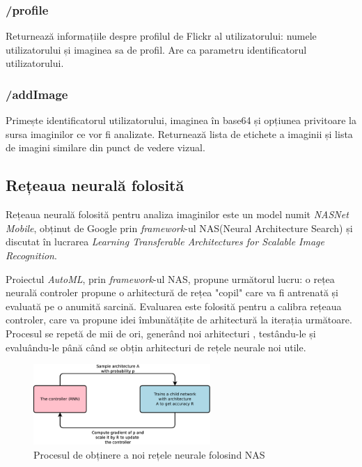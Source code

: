 \subsubsection{/profile}
Returnează informațiile despre profilul de Flickr al utilizatorului: numele utilizatorului și imaginea sa de profil. Are ca parametru identificatorul utilizatorului.

\subsubsection{/addImage}
Primește identificatorul utilizatorului, imaginea în base64 și opțiunea privitoare la sursa imaginilor ce vor fi analizate. Returnează lista de etichete a imaginii și lista de imagini similare din punct de vedere vizual.

\subsection{Rețeaua neurală folosită}
Rețeaua neurală folosită pentru analiza imaginilor este un model numit \textit{NASNet Mobile}, obținut de Google prin \textit{framework}-ul NAS(Neural Architecture Search) și discutat în lucrarea \textit{Learning Transferable Architectures for Scalable Image Recognition}. \cite{DBLP:journals/corr/ZophVSL17}

Proiectul \textit{AutoML}, prin \textit{framework}-ul NAS, propune următorul lucru: o rețea neurală controler propune o arhitectură de rețea "copil" care va fi antrenată și evaluată pe o anumită sarcină. Evaluarea este folosită pentru a calibra rețeaua controler, care va propune idei îmbunătățite de arhitectură la iterația următoare. Procesul se repetă de mii de ori, generând noi arhitecturi , testându-le și evaluându-le până când se obțin arhitecturi de rețele neurale noi utile.\cite{45826}

\begin{figure}[!htbp]
    \begin{center}
        \includegraphics[width=0.6\textwidth]{images/nas.png}
        \caption{Procesul de obținere a noi rețele neurale folosind NAS \cite{45826}}
    \end{center}
\end{figure}

